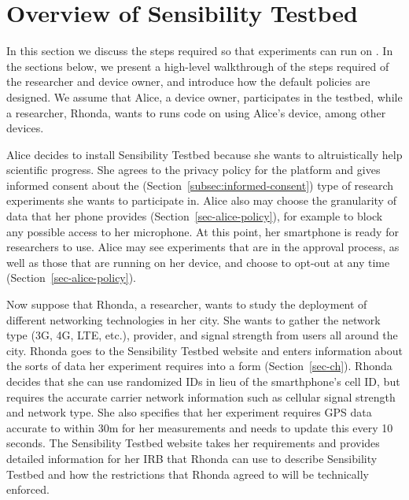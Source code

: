 \section{Overview of Sensibility Testbed}\label{sec-overview}

In this section we discuss the steps required so that experiments 
can run on \sysname. 
%
In the sections below, we present a high-level walkthrough of the steps 
required of the researcher and device owner, and 
introduce how the default policies are designed. 
We assume that Alice, a device owner, participates in 
the testbed, while a researcher, Rhonda, wants to runs code on \sysname 
using Alice's device, among other devices.


Alice decides to install Sensibility Testbed because she wants to 
altruistically help scientific progress.  She agrees to the privacy
policy for the platform and gives informed consent about the (Section~\ref{subsec:informed-consent})
type of research experiments she wants to participate in.  Alice also
may choose the granularity of data that her phone provides (Section~\ref{sec-alice-policy}), for 
example to block any possible access to her microphone.  At this point,
her smartphone is ready for researchers to use.  Alice may see experiments 
that are in the approval process, as
well as those that are running on her device, and choose
to opt-out at any time (Section~\ref{sec-alice-policy}). 

Now suppose that Rhonda, a researcher, wants to study the deployment of
different networking technologies in her city.  She wants to gather
the network type (3G, 4G, LTE, etc.), provider, and signal strength from
users all around the city.  Rhonda goes to the Sensibility Testbed website
and enters information about the sorts of data her experiment requires
into a form (Section~\ref{sec-ch}).  Rhonda decides that she can use randomized IDs in lieu 
of the smarthphone's cell ID, but requires the accurate carrier 
network information such as cellular signal strength and network type. 
She also specifies that her experiment requires GPS data accurate to within
30m for her measurements and needs to update this every 10 seconds.
The Sensibility Testbed website takes her requirements and provides detailed
information for her IRB that Rhonda can use to describe Sensibility
Testbed and how the restrictions that Rhonda agreed to will be technically
enforced.


